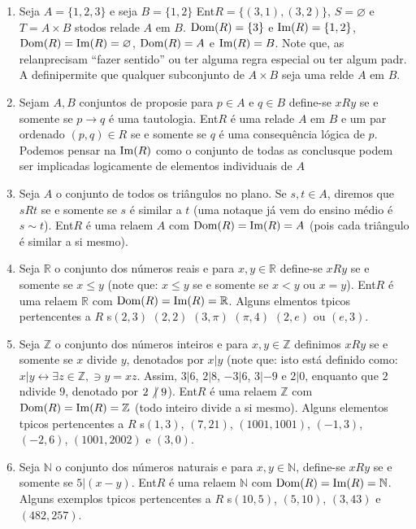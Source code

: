 \begin{enumerate}[{\bf 1.}]
\item\label{relex6} Seja $A=\{1,2,3\}$ e seja $B=\{1,2\}$ Ent\ao $R=\{(3,1),(3,2)\}$, $S=\varnothing$ e $T=A\times B$ s\ao todos rela\coes de $A$ em $B$. $\operatorname{Dom}(R)=\{3\}$ e $\operatorname{Im}(R)=\{1,2\}$, $\operatorname{Dom}(R)=\operatorname{Im}(R)=\varnothing$, $\operatorname{Dom}(R)=A$ e $\operatorname{Im}(R)=B$. Note que, as rela\coes n\ao precisam ``fazer sentido'' ou ter alguma regra especial ou ter algum padr\aoi. A defini\cao permite que qualquer subconjunto de $A\times B$ seja uma rel\cao de $A$ em $B$.

\item\label{relex7} Sejam $A,B$ conjuntos de proposi\coes e para $p\in A$ e $q\in B$ define-se $xRy$ se e somente se $p\to q$ \'e uma tautologia. Ent\ao $R$ \'e uma rela\cao de $A$ em $B$ e um par ordenado $(p,q)\in R$ se e somente se $q$ \'e uma consequ\^encia l\'ogica de $p$. Podemos pensar na $\operatorname{Im}(R)$ como o conjunto de todas as conclus\oes que podem ser implicadas logicamente de elementos individuais de $A$ 

\item\label{relex8} Seja $A$ o conjunto de todos os tri\^angulos no plano. Se $s,t\in A$, diremos que $sRt$ se e somente se $s$ \'e similar a $t$ (uma nota\cao que j\'a vem do ensino m\'edio \'e $s\sim t$). Ent\ao $R$ \'e uma rela\cao em $A$ com $\operatorname{Dom}(R)=\operatorname{Im}(R)=A$ (pois cada tri\^angulo \'e similar a si mesmo).

\item\label{relex9} Seja $\mathbb{R}$ o conjunto dos n\'umeros reais e para $x,y\in\mathbb{R}$ define-se $xRy$ se e somente se $x\leq y$ (note que: $x\leq y$ se e somente se $x<y$ ou $x=y$). Ent\ao $R$ \'e uma rela\cao em $\mathbb{R}$ com $\operatorname{Dom}(R)=\operatorname{Im}(R)=\mathbb{R}$. Alguns elmentos t\ih picos pertencentes a $R$ s\ao $(2,3)$ $(2,2)$ $(3,\pi)$ $(\pi,4)$ $(2,e)$ ou $(e,3)$.
 
\item\label{relex10} Seja $\mathbb{Z}$ o conjunto dos n\'umeros inteiros e para $x,y\in\mathbb{Z}$ definimos $xRy$ se e somente se $x$ divide $y$, denotados por $x|y$ (note que: isto est\'a definido como: $x|y\leftrightarrow\exists z\in \mathbb{Z},\ni y=xz$. Assim, $3|6$, $2|8$, $-3|6$, $3|-9$ e $2|0$, enquanto que $2$ n\ao divide $9$, denotado por $2\not\vert\textrm{ } 9$). Ent\ao $R$ \'e uma rela\cao em $\mathbb{Z}$ com $\operatorname{Dom}(R)=\operatorname{Im}(R)=\mathbb{Z}$ (todo inteiro divide a si mesmo). Alguns elementos t\ih picos pertencentes a $R$ s\ao $(1,3)$, $(7,21)$, $(1001,1001)$, $(-1,3)$, $(-2,6)$, $(1001,2002)$ e $(3,0)$.

\item\label{relex11} Seja $\mathbb{N}$ o conjunto dos n\'umeros naturais e para $x,y\in\mathbb{N}$, define-se $xRy$ se e somente se $5|(x-y)$. Ent\ao $R$ \'e uma rela\cao em $\mathbb{N}$ com $\operatorname{Dom}(R)=\operatorname{Im}(R)=\mathbb{N}$. Alguns exemplos t\ih picos pertencentes a $R$ s\ao $(10,5)$, $(5,10)$, $(3,43)$ e $(482,257)$. 
\end{enumerate}

